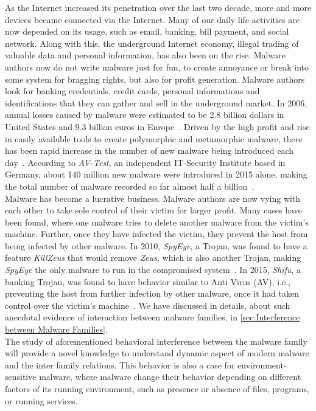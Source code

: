 As the Internet increased its penetration over the last two decade, more and more devices became connected via the Internet.
Many of our daily life activities are now depended on its usage, such as email, banking, bill payment, and social network.
Along with this, the underground Internet economy, illegal trading of valuable data and personal information, has also been on the rise.
Malware authors now do not write malware just for fun, to create annoyance or break into some system for bragging rights, but also for profit generation.
Malware authors look for banking credentials, credit cards, personal informations and identifications that they can gather and sell in the underground market.
In 2006, annual losses caused by malware were estimated to be 2.8 billion dollars in United States and 9.3 billion euros in Europe~\cite[]{moore2009economics}.
Driven by the high profit and rise in easily available tools to create polymorphic and metamorphic malware, there has been rapid increase in the number of new malware being introduced each day~\cite[]{tian}.
According to \emph{AV-Test}, an independent IT-Security Institute based in Germany, about 140 million new malware were introduced in 2015 alone, making the total number of malware recorded so far almost half a billion~\cite[]{avtest}.
\\
Malware has become a lucrative business.
Malware authors are now vying with each other to take sole control of their victim for larger profit.
Many cases have been found, where one malware tries to delete another malware from the victim's machine.
Further, once they have infected the victim, they prevent the host from being infected by other malware.
In 2010, \emph{SpyEye}, a Trojan, was found to have a feature \emph{KillZeus} that would remove \emph{Zeus}, which is also another Trojan, making \emph{SpyEye} the only malware to run in the compromised system~\cite[]{sanszeus}.
In 2015, \emph{Shifu}, a banking Trojan, was found to have behavior similar to Anti Virus (AV), i.e., preventing the host from further infection by other malware, once it had taken control over the victim's machine~\cite[]{secintelshifu}.
We have discussed in details, about such anecdotal evidence of interaction between malware families, in \autoref{sec:Interference between Malware Families}.\\
The study of aforementioned behavioral interference between the malware family will provide a novel knowledge to understand dynamic aspect of modern malware and the inter family relations.
This behavior is also a case for environment-sensitive malware, where malware change their behavior depending on different factors of its running environment, such as presence or absence of files, programs, or running services.
